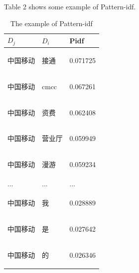 \documentclass{sig-alternate}
\begin{document}
Table 2 shows some example of Pattern-idf.
\begin{table}[]
\centering
\caption{The example of Pattern-idf}
\label{my-label}
\begin{tabular}{lll}
\hline
 $D_j$ & $D_i$ & Pidf \\ \hline
 \begin{CJK}{UTF8}{gbsn}中国移动\end{CJK} & \begin{CJK}{UTF8}{gbsn}接通\end{CJK}   & 0.071725 \\ \hline
 \begin{CJK}{UTF8}{gbsn}中国移动\end{CJK} & cmcc                                  & 0.067261 \\ \hline
 \begin{CJK}{UTF8}{gbsn}中国移动\end{CJK} & \begin{CJK}{UTF8}{gbsn}资费\end{CJK}   & 0.062408 \\ \hline
 \begin{CJK}{UTF8}{gbsn}中国移动\end{CJK} & \begin{CJK}{UTF8}{gbsn}营业厅\end{CJK} & 0.059949 \\ \hline
 \begin{CJK}{UTF8}{gbsn}中国移动\end{CJK} & \begin{CJK}{UTF8}{gbsn}漫游\end{CJK}   & 0.059234 \\ \hline
 ... & ...  & ...  \\ \hline
 \begin{CJK}{UTF8}{gbsn}中国移动\end{CJK} & \begin{CJK}{UTF8}{gbsn}我\end{CJK}    & 0.028889 \\ \hline
 \begin{CJK}{UTF8}{gbsn}中国移动\end{CJK} & \begin{CJK}{UTF8}{gbsn}是\end{CJK}    & 0.027642 \\ \hline
 \begin{CJK}{UTF8}{gbsn}中国移动\end{CJK} & \begin{CJK}{UTF8}{gbsn}的\end{CJK}    & 0.026346 \\ \hline
\end{tabular}
\end{table}
\end{document}
